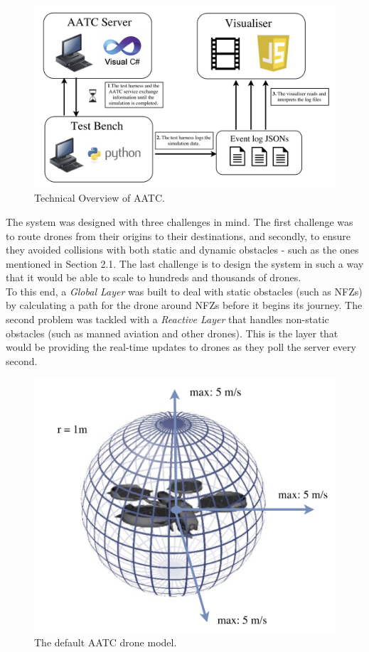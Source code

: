 \documentclass[a4paper,12pt,titlepage]{article}
\begin{document}
\begin{figure}[!hbpt]
  \center
  \includegraphics[width=\linewidth]{img/aatc_tech_overview.jpg}
  \caption{Technical Overview of AATC. \cite{Balaji2017}}
  \label{fig:aatc_tech_overview}
\end{figure}

The system was designed with three challenges in mind. The first challenge was to route drones from their origins to their destinations, and secondly, to ensure they avoided collisions with both static and dynamic obstacles - such as the ones mentioned in Section 2.1. The last challenge is to design the system in such a way that it would be able to scale to hundreds and thousands of drones. \\

\newpage
To this end, a \textit{Global Layer} was built to deal with static obstacles (such as NFZs) by calculating a path for the drone around NFZs before it begins its journey. The second problem was tackled with a \textit{Reactive Layer} that handles non-static obstacles (such as manned aviation and other drones). This is the layer that would be providing the real-time updates to drones as they poll the server every second. \\

\begin{figure}[!hbpt]
  \center
  \includegraphics[width=0.8\linewidth]{img/edrone.jpg}
  \caption{The default AATC drone model. \cite{Balaji2017}}
  \label{fig:edrone}
\end{figure}
\end{document}
